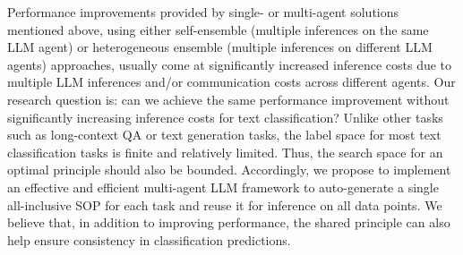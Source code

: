 Performance improvements provided by single- or multi-agent solutions mentioned above, using either self-ensemble (multiple inferences on the same LLM agent) or heterogeneous ensemble (multiple inferences on different LLM agents) approaches, usually come at significantly increased inference costs due to multiple LLM inferences and/or communication costs across different agents. Our research question is: can we achieve the same performance improvement without significantly increasing inference costs for text classification? Unlike other tasks such as long-context QA or text generation tasks, the label space for most text classification tasks is finite and relatively limited. Thus, the search space for an optimal principle should also be bounded. Accordingly, we propose to implement an effective and efficient multi-agent LLM framework to auto-generate a single all-inclusive SOP for each task and reuse it for inference on all data points. We believe that, in addition to improving performance, the shared principle can also help ensure consistency in classification predictions.